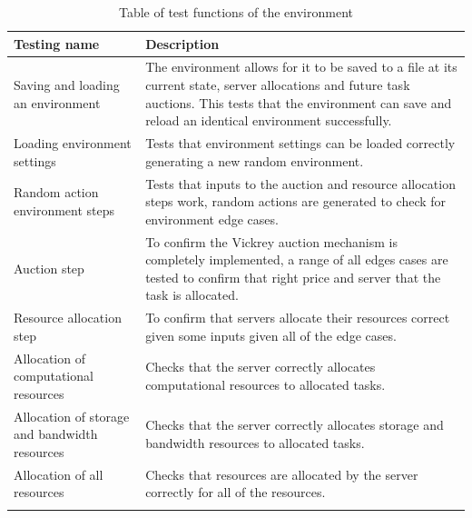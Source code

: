 \begin{longtable}{|p{3cm}|p{11cm}|} \hline
    \textbf{Testing name} & \textbf{Description} \\ \hline
    Saving and loading an environment & The environment allows for it to be saved to a file at its current state,
        server allocations and future task auctions. This tests that the environment can save and reload an
        identical environment successfully. \\ \hline
    Loading environment settings & Tests that environment settings can be loaded correctly generating a new random
        environment. \\ \hline
    Random action environment steps & Tests that inputs to the auction and resource allocation steps work,
        random actions are generated to check for environment edge cases.  \\ \hline
    Auction step & To confirm the Vickrey auction mechanism is completely implemented, a range of all edges cases
        are tested to confirm that right price and server that the task is allocated. \\ \hline
    Resource allocation step & To confirm that servers allocate their resources correct given some inputs given all of
        the edge cases. \\ \hline
    Allocation of computational resources & Checks that the server correctly allocates computational resources to
        allocated tasks. \\ \hline
    Allocation of storage and bandwidth resources & Checks that the server correctly allocates storage and
        bandwidth resources to allocated tasks. \\ \hline
    Allocation of all resources & Checks that resources are allocated by the server correctly for all of the
        resources. \\ \hline
    \caption{Table of test functions of the environment}
    \label{tab:env_testing}
\end{longtable}

